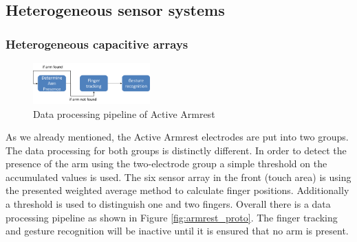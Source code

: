 \subsection{Heterogeneous sensor systems}
\subsubsection{Heterogeneous capacitive arrays}
\begin{figure}[h]
\centering
\includegraphics[width=0.4\textwidth]{images/armrest_dataproc}
\caption{Data processing pipeline of Active Armrest}
\label{fig:armrest_dataproc}
\end{figure}
As we already mentioned, the Active Armrest electrodes are put into two groups. The data processing for both groups is distinctly different. In order to detect the presence of the arm using the two-electrode group a simple threshold on the accumulated values is used. The six sensor array in the front (touch area) is using the presented weighted average method to calculate finger positions. Additionally a threshold is used to distinguish one and two fingers. Overall there is a data processing pipeline as shown in Figure \ref{fig:armrest_proto}. The finger tracking and gesture recognition will be inactive until it is ensured that no arm is present. 
